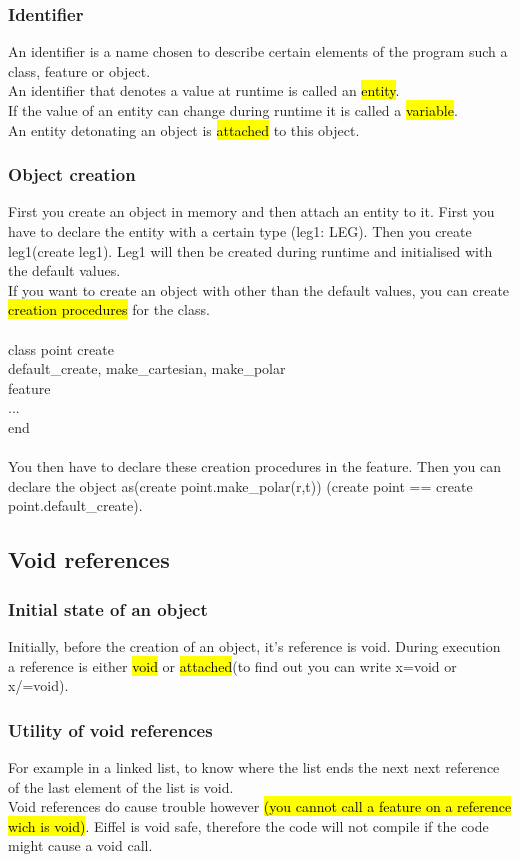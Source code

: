 \documentclass[11pt]{article}
\newcommand\tab[1][1cm]{\hspace*{#1}}
\begin{document}
\subsubsection{Identifier}
An identifier is a name chosen to describe certain elements of the program such a class, feature or object.\\ An identifier that denotes a value at runtime is called an \hl{entity}.\\ If the value of an entity can change during runtime it is called a \hl{variable}.\\ An entity detonating an object is \hl{attached} to this object. 
\subsubsection{Object creation}
First you create an object in memory and then attach an entity to it. First you have to declare the entity with a certain type (leg1: LEG). Then you create leg1(create leg1). Leg1 will then be created during runtime and initialised with the default values.\\ If you want to create an object with other than the default values, you can create \hl{creation procedures} for the class.\\\\class point create\\\tab default\_create, make\_cartesian, make\_polar\\feature\\\tab...\\end\\\\ You then have to declare these creation procedures in the feature. Then you can declare the object as(create point.make\_polar(r,t)) (create point == create point.default\_create).
\subsection{Void references}
\subsubsection{Initial state of an object}
Initially, before the creation of an object, it's reference is void. During execution a reference is either \hl{void} or \hl{attached}(to find out you can write x=void or x/=void).
\subsubsection{Utility of void references}
For example in a linked list, to know where the list ends the next next reference of the last element of the list is void.\\ Void references do cause trouble however \hl{(you cannot call a feature on a reference wich is void)}. Eiffel is void safe, therefore the code will not compile if the code might cause a void call.
\end{document}
